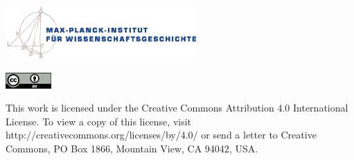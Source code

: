 \thispagestyle{empty}
\includegraphics[width=0.55\textwidth]{bilder/misc/MPIWG_d_WM_4c.eps}
\vspace{20mm}
\maketitle

\vfill

\noindent\includegraphics[width=0.13\textwidth]{bilder/misc/by.eps}

\noindent

This work is licensed under the Creative Commons Attribution 4.0 International License. To view a copy of this license, visit http://creativecommons.org/licenses/by/4.0/ or send a letter to Creative Commons, PO Box 1866, Mountain View, CA 94042, USA.


